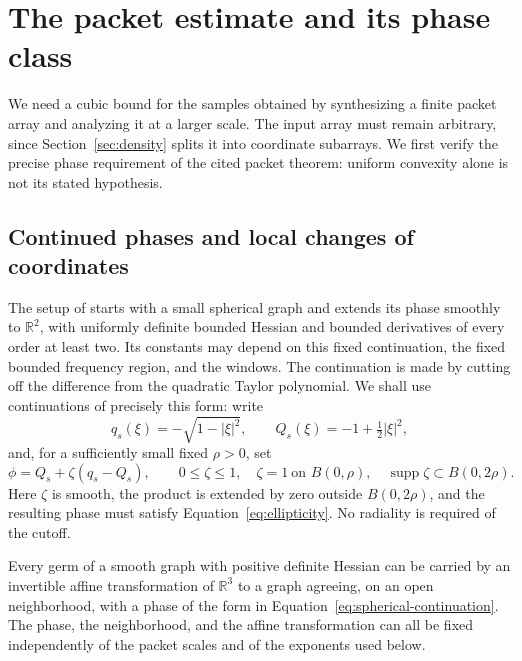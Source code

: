 \section{The packet estimate and its phase class}\label{sec:packets}

We need a cubic bound for the samples obtained by synthesizing a
finite packet array and analyzing it at a larger scale. The input
array must remain arbitrary, since Section~\ref{sec:density} splits
it into coordinate subarrays. We first verify the precise phase
requirement of the cited packet theorem: uniform convexity alone
is not its stated hypothesis.

\subsection{Continued phases and local changes of coordinates}

The setup of \cite[Section~\PacketPhaseSection]{OpenAIPacket2026} starts with a
small spherical graph and extends its phase smoothly to
$\mathbb R^2$, with uniformly definite bounded Hessian and bounded
derivatives of every order at least two.  Its constants may depend on
this fixed continuation, the fixed bounded frequency region, and the
windows.  The continuation is made by cutting off the difference
from the quadratic Taylor polynomial.  We shall use continuations of
precisely this form: write
\[
 q_s(\xi)=-\sqrt{1-|\xi|^2},\qquad
 Q_s(\xi)=-1+\tfrac12|\xi|^2,
\]
and, for a sufficiently small fixed $\rho>0$, set
\begin{equation}\label{eq:spherical-continuation}
 \phi=Q_s+\zeta(q_s-Q_s),
 \qquad
 0\le\zeta\le1,\quad
 \zeta=1\ \text{on }B(0,\rho),\quad
 \operatorname{supp}\zeta\subset B(0,2\rho).
\end{equation}
Here $\zeta$ is smooth, the product is extended by zero outside
$B(0,2\rho)$, and the resulting phase must satisfy
Equation~\eqref{eq:ellipticity}.  No radiality is required of the cutoff.

\begin{lemma}\label{lem:continuation}
Every germ of a smooth graph with positive definite Hessian can be
carried by an invertible affine transformation of $\mathbb R^3$ to a
graph agreeing, on an open neighborhood, with a phase of the form in
Equation~\eqref{eq:spherical-continuation}.  The phase, the neighborhood, and
the affine transformation can all be fixed independently of the
packet scales and of the exponents used below.
\end{lemma}

